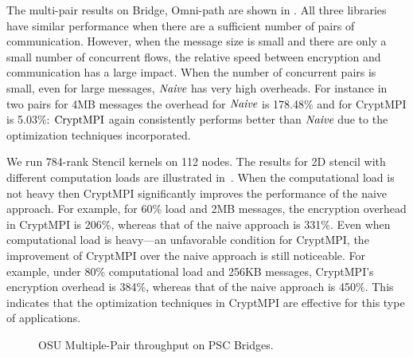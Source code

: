 The multi-pair results on Bridge, Omni-path are shown in
.
All three libraries have similar
performance when there are a sufficient number of pairs of communication.
However, when the message size is small and there are only a small number
of concurrent flows, the relative speed between encryption and communication
has a large impact. When the number of concurrent pairs is small,
even for large messages, ${\emph{Naive}}$ has very high overheads. For instance in
two pairs for 4MB messages the overhead for ${\emph{Naive}}$  is 178.48\% and
for CryptMPI is 5.03\%: $\textrm{CryptMPI}$ again consistently performs
better than ${\emph{Naive}}$ due to the optimization techniques incorporated.


We run 784-rank Stencil kernels on 112 nodes. 
The results for 2D stencil with different computation loads
are illustrated in~. 
When the computational load is not heavy then CryptMPI
significantly improves the performance of the naive  approach. 
For example, for 60\% load and 2MB messages, 
the encryption overhead in CryptMPI is 206\%, 
whereas that of the naive approach is 331\%. 
Even when computational load is heavy---an unfavorable condition for CryptMPI, 
the improvement of CryptMPI over the naive approach is still noticeable. 
For example, under 80\% computational load and 256KB messages, CryptMPI's
encryption overhead is 384\%, 
whereas that of the naive approach is 450\%.
This indicates that the optimization techniques in CryptMPI
are effective for this type of applications. 


\begin{figure}[hbp]
\centering
	\captionsetup{singlelinecheck=false}
	\caption{OSU Multiple-Pair throughput on PSC Bridges. }
	\label{fig:xsede_multipair_infiniband}
	\vspace{-1.5ex}
	\end{figure}


